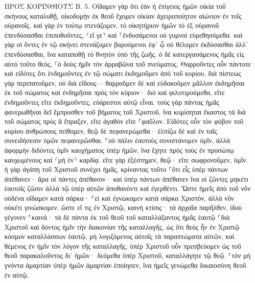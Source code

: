 \documentclass[twoside, 9pt]{extreport}
\begin{document}
ΠΡΟΣ ΚΟΡΙΝΘΙΟΥΣ Β.
5.
Οἴδαμεν γὰρ ὅτι ἐὰν ἡ ἐπίγειος ἡμῶν οἰκία τοῦ σκήνους καταλυθῇ, οἰκοδομὴν ἐκ θεοῦ ἔχομεν οἰκίαν ἀχειροποίητον αἰώνιον ἐν τοῖς οὐρανοῖς. 
καὶ γὰρ ἐν τούτῳ στενάζομεν, τὸ οἰκητήριον ἡμῶν τὸ ἐξ οὐρανοῦ ἐπενδύσασθαι ἐπιποθοῦντες, 
⸂εἴ γε⸃ καὶ ⸀ἐνδυσάμενοι οὐ γυμνοὶ εὑρεθησόμεθα. 
καὶ γὰρ οἱ ὄντες ἐν τῷ σκήνει στενάζομεν βαρούμενοι ἐφ᾽ ᾧ οὐ θέλομεν ἐκδύσασθαι ἀλλ᾽ ἐπενδύσασθαι, ἵνα καταποθῇ τὸ θνητὸν ὑπὸ τῆς ζωῆς. 
ὁ δὲ κατεργασάμενος ἡμᾶς εἰς αὐτὸ τοῦτο θεός, ⸀ὁ δοὺς ἡμῖν τὸν ἀρραβῶνα τοῦ πνεύματος. 
Θαρροῦντες οὖν πάντοτε καὶ εἰδότες ὅτι ἐνδημοῦντες ἐν τῷ σώματι ἐκδημοῦμεν ἀπὸ τοῦ κυρίου, 
διὰ πίστεως γὰρ περιπατοῦμεν, οὐ διὰ εἴδους— 
θαρροῦμεν δὲ καὶ εὐδοκοῦμεν μᾶλλον ἐκδημῆσαι ἐκ τοῦ σώματος καὶ ἐνδημῆσαι πρὸς τὸν κύριον· 
διὸ καὶ φιλοτιμούμεθα, εἴτε ἐνδημοῦντες εἴτε ἐκδημοῦντες, εὐάρεστοι αὐτῷ εἶναι. 
τοὺς γὰρ πάντας ἡμᾶς φανερωθῆναι δεῖ ἔμπροσθεν τοῦ βήματος τοῦ Χριστοῦ, ἵνα κομίσηται ἕκαστος τὰ διὰ τοῦ σώματος πρὸς ἃ ἔπραξεν, εἴτε ἀγαθὸν εἴτε ⸀φαῦλον. 
Εἰδότες οὖν τὸν φόβον τοῦ κυρίου ἀνθρώπους πείθομεν, θεῷ δὲ πεφανερώμεθα· ἐλπίζω δὲ καὶ ἐν ταῖς συνειδήσεσιν ὑμῶν πεφανερῶσθαι. 
⸀οὐ πάλιν ἑαυτοὺς συνιστάνομεν ὑμῖν, ἀλλὰ ἀφορμὴν διδόντες ὑμῖν καυχήματος ὑπὲρ ἡμῶν, ἵνα ἔχητε πρὸς τοὺς ἐν προσώπῳ καυχωμένους καὶ ⸂μὴ ἐν⸃ καρδίᾳ. 
εἴτε γὰρ ἐξέστημεν, θεῷ· εἴτε σωφρονοῦμεν, ὑμῖν. 
ἡ γὰρ ἀγάπη τοῦ Χριστοῦ συνέχει ἡμᾶς, κρίναντας τοῦτο ⸀ὅτι εἷς ὑπὲρ πάντων ἀπέθανεν· ἄρα οἱ πάντες ἀπέθανον· 
καὶ ὑπὲρ πάντων ἀπέθανεν ἵνα οἱ ζῶντες μηκέτι ἑαυτοῖς ζῶσιν ἀλλὰ τῷ ὑπὲρ αὐτῶν ἀποθανόντι καὶ ἐγερθέντι. 
Ὥστε ἡμεῖς ἀπὸ τοῦ νῦν οὐδένα οἴδαμεν κατὰ σάρκα· ⸀εἰ καὶ ἐγνώκαμεν κατὰ σάρκα Χριστόν, ἀλλὰ νῦν οὐκέτι γινώσκομεν. 
ὥστε εἴ τις ἐν Χριστῷ, καινὴ κτίσις· τὰ ἀρχαῖα παρῆλθεν, ἰδοὺ γέγονεν ⸀καινά· 
τὰ δὲ πάντα ἐκ τοῦ θεοῦ τοῦ καταλλάξαντος ἡμᾶς ἑαυτῷ ⸀διὰ Χριστοῦ καὶ δόντος ἡμῖν τὴν διακονίαν τῆς καταλλαγῆς, 
ὡς ὅτι θεὸς ἦν ἐν Χριστῷ κόσμον καταλλάσσων ἑαυτῷ, μὴ λογιζόμενος αὐτοῖς τὰ παραπτώματα αὐτῶν, καὶ θέμενος ἐν ἡμῖν τὸν λόγον τῆς καταλλαγῆς. 
ὑπὲρ Χριστοῦ οὖν πρεσβεύομεν ὡς τοῦ θεοῦ παρακαλοῦντος δι᾽ ἡμῶν· δεόμεθα ὑπὲρ Χριστοῦ, καταλλάγητε τῷ θεῷ. 
⸀τὸν μὴ γνόντα ἁμαρτίαν ὑπὲρ ἡμῶν ἁμαρτίαν ἐποίησεν, ἵνα ἡμεῖς γενώμεθα δικαιοσύνη θεοῦ ἐν αὐτῷ. 
\end{document}
